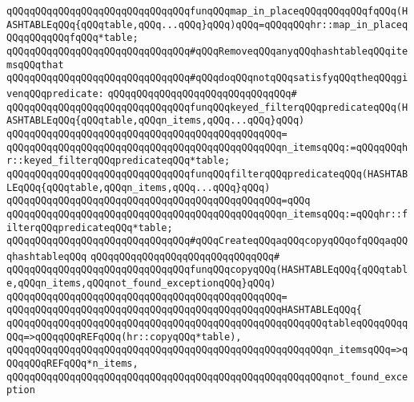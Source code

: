 \verb|qQQqqQQqqQQqqQQqqQQqqQQqqQQqqQQqfunqQQqmap_in_placeqQQqqQQqqQQqfqQQq(HASHTABLEqQQq{qQQqtable,qQQq...qQQq}qQQq)qQQq=qQQqqQQqhr::map_in_placeqQQqqQQqqQQqfqQQq*table;|\newline
\newline
\verb|qQQqqQQqqQQqqQQqqQQqqQQqqQQqqQQq#qQQqRemoveqQQqanyqQQqhashtableqQQqitemsqQQqthat|\newline
\verb|qQQqqQQqqQQqqQQqqQQqqQQqqQQqqQQq#qQQqdoqQQqnotqQQqsatisfyqQQqtheqQQqgivenqQQqpredicate:|\newline
\verb|qQQqqQQqqQQqqQQqqQQqqQQqqQQqqQQq#|\newline
\verb|qQQqqQQqqQQqqQQqqQQqqQQqqQQqqQQqfunqQQqkeyed_filterqQQqpredicateqQQq(HASHTABLEqQQq{qQQqtable,qQQqn_items,qQQq...qQQq}qQQq)|\newline
\verb|qQQqqQQqqQQqqQQqqQQqqQQqqQQqqQQqqQQqqQQqqQQqqQQq=|\newline
\verb|qQQqqQQqqQQqqQQqqQQqqQQqqQQqqQQqqQQqqQQqqQQqqQQqn_itemsqQQq:=qQQqqQQqhr::keyed_filterqQQqpredicateqQQq*table;|\newline
\newline
\verb|qQQqqQQqqQQqqQQqqQQqqQQqqQQqqQQqfunqQQqfilterqQQqpredicateqQQq(HASHTABLEqQQq{qQQqtable,qQQqn_items,qQQq...qQQq}qQQq)|\newline
\verb|qQQqqQQqqQQqqQQqqQQqqQQqqQQqqQQqqQQqqQQqqQQqqQQq=qQQq|\newline
\verb|qQQqqQQqqQQqqQQqqQQqqQQqqQQqqQQqqQQqqQQqqQQqqQQqn_itemsqQQq:=qQQqhr::filterqQQqpredicateqQQq*table;|\newline
\newline
\verb|qQQqqQQqqQQqqQQqqQQqqQQqqQQqqQQq#qQQqCreateqQQqaqQQqcopyqQQqofqQQqaqQQqhashtableqQQq|\newline
\verb|qQQqqQQqqQQqqQQqqQQqqQQqqQQqqQQq#|\newline
\verb|qQQqqQQqqQQqqQQqqQQqqQQqqQQqqQQqfunqQQqcopyqQQq(HASHTABLEqQQq{qQQqtable,qQQqn_items,qQQqnot_found_exceptionqQQq}qQQq)|\newline
\verb|qQQqqQQqqQQqqQQqqQQqqQQqqQQqqQQqqQQqqQQqqQQqqQQq=|\newline
\verb|qQQqqQQqqQQqqQQqqQQqqQQqqQQqqQQqqQQqqQQqqQQqqQQqHASHTABLEqQQq{|\newline
\verb|qQQqqQQqqQQqqQQqqQQqqQQqqQQqqQQqqQQqqQQqqQQqqQQqqQQqqQQqtableqQQqqQQqqQQq=>qQQqqQQqREFqQQq(hr::copyqQQq*table),|\newline
\verb|qQQqqQQqqQQqqQQqqQQqqQQqqQQqqQQqqQQqqQQqqQQqqQQqqQQqqQQqn_itemsqQQq=>qQQqqQQqREFqQQq*n_items,|\newline
\verb|qQQqqQQqqQQqqQQqqQQqqQQqqQQqqQQqqQQqqQQqqQQqqQQqqQQqqQQqnot_found_exception|\newline
